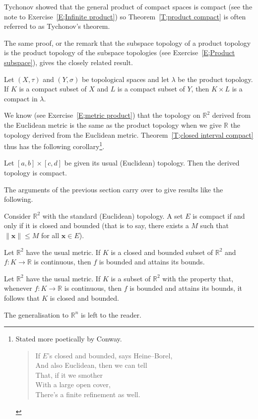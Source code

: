 Tychonov showed that
the general product of compact spaces
is compact (see the note to Exercise~\ref{E;Infinite product})
so Theorem~\ref{T;product compact} is often
referred to as Tychonov's theorem.

The same proof, or the remark that the subspace topology
of a product topology is the product topology of the subspace
topologies (see Exercise~\ref{E;Product subspace}),
gives the closely related result.
\begin{theorem}\label{T;product subspace compact}
Let $(X,\tau)$ and $(Y,\sigma)$ be topological spaces
and let $\lambda$ be the product topology.
If $K$ is a compact subset of $X$ and
$L$ is a compact subset of $Y$, then $K\times L$
is a compact in $\lambda$.
\end{theorem}
We know (see Exercise~\ref{E;metric product}) that the topology
on ${\mathbb R}^{2}$ derived from the Euclidean metric
is the same as the product topology when we
give ${\mathbb R}$ the topology derived from the Euclidean metric.
Theorem~\ref{T;closed interval compact} thus has the following
corollary\footnote{Stated more poetically by Conway.
\begin{verse}
If $E$'s closed and bounded, says Heine--Borel,\\
And also Euclidean, then we can tell\\
That, if it we smother\\
With a large open cover,\\
There's a finite refinement as well.
\end{verse}
}.
\begin{theorem}
Let $[a,b]\times[c,d]$ be given its usual (Euclidean)
topology. Then the derived topology is compact.
\end{theorem}
The arguments of the previous section carry over to give
results like the following.
\begin{theorem}
Consider ${\mathbb R}^{2}$ with the standard
(Euclidean) topology. A set $E$ is compact if and
only if it is closed and bounded
(that is to say, there exists a
$M$ such that $\|{\mathbf x}\|\leq M$ for all ${\mathbf x}\in E$).
\end{theorem}
\begin{theorem}\label{T;compact Euclidean}
Let ${\mathbb R}^{2}$ have the usual metric.
If $K$ is a
closed and bounded subset of ${\mathbb R}^{2}$
and $f:K\rightarrow{\mathbb R}$ is continuous,
then $f$ is bounded and attains its bounds.
\end{theorem}
\begin{problem}
Let ${\mathbb R}^{2}$ have the usual metric.
If $K$ is a subset of ${\mathbb R}^{2}$ with the property
that, whenever $f:K\rightarrow{\mathbb R}$ is continuous,
then $f$ is bounded and attains its bounds, it follows
that $K$ is closed and bounded.
\end{problem}
The generalisation to ${\mathbb R}^{n}$ is left to the reader.

